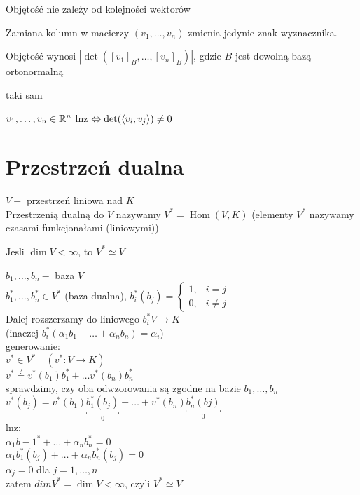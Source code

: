 \begin{wn} Objętość nie zależy od kolejności wektorów \end{wn} 
\begin{dd} Zamiana kolumn w macierzy $(v_1,\ldots,v_n)$ zmienia jedynie znak wyznacznika. 
\end{dd} 
\begin{wn} Objętość wynosi $|\det([v_1]_B,\ldots,[v_n]_B)|$, gdzie $B$ jest dowolną bazą 
ortonormalną \end{wn} 
\begin{dd} taki sam \end{dd} 
\begin{wn} $v_1,\ldots,v_n \in \mathbb{R}^n$ lnz $\Leftrightarrow \det(\left\langle v_i, v_j \right\rangle) \neq 0$
\end{wn} 
\section{Przestrzeń dualna} 
\begin{df} 
    $V - $ przestrzeń liniowa nad $K$ \\ 
    Przestrzenią dualną do $V$ nazywamy $V^* = \operatorname{Hom} (V,K)$ (elementy 
    $V^*$ nazywamy czasami funkcjonałami (liniowymi))
\end{df} 
\begin{ft} 
    Jesli $\dim V < \infty$, to $V^* \simeq V$
\end{ft} 
\begin{dd} 
    $b_1,\ldots,b_n - $ baza $V$ \\ 
    $b_1^*,\ldots,b_n^* \in V^*$ (baza dualna), $ b_i^* (b_j) = 
    \begin{cases} 1, & i = j \\ 0, & i \neq j \end{cases}$ \\
    Dalej rozszerzamy do liniowego $b_i^* V \to K$ \\ 
    (inaczej $b_i^* (\alpha_1 b_1 + \ldots + \alpha_n b_n) = \alpha_i$) \\ 
    generowanie: \\ 
    $v^* \in V^* \quad (v^* : V \to K)$ \\ 
    $ v^* \overset{?}{=} v^*(b_1) b^*_1 + \ldots v^*(b_n) b^*_n$ \\ 
    sprawdzimy, czy oba odwzorowania są zgodne na bazie $b_1,\ldots,b_n$  \\ 
    $v^* (b_j) = v^*(b_1) \underbracket{b_1^*(b_j)}_{0} + \ldots + 
    v^*(b_n) \underbracket{b_n^* (bj)}_{0}$ \\ 
    lnz: \\ 
    $\alpha_1 b-1 ^* + \ldots + \alpha_n b_n^* = 0$ \\ 
    $\alpha_1 b_1 ^* (b_j) + \ldots + \alpha_n b_n^*(b_j) = 0$ \\ 
    $\alpha_j = 0$ dla $j = 1,\ldots,n$ \\ 
    zatem $dim V^* = \dim V < \infty$, czyli $V^* \simeq V$ 
\end{dd} 

